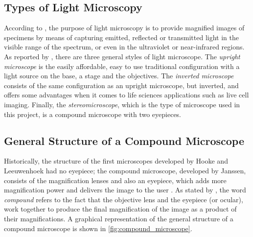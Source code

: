 \subsection{Types of Light Microscopy}

According to , the purpose of light microscopy is to provide magnified images of specimens by means of capturing emitted, reflected or transmitted light in the visible range of the spectrum, or even in the ultraviolet or near-infrared regions. As reported by , there are three general styles of light microscope. The \emph{upright microscope} is the easily affordable, easy to use traditional configuration with a light source on the base, a stage and the objectives. The \emph{inverted microscope} consists of the same configuration as an upright microscope, but inverted, and offers some advantages when it comes to life sciences applications such as live cell imaging. Finally, the \emph{stereomicroscope}, which is the type of microscope used in this project, is a compound microscope with two eyepieces.

\subsection{General Structure of a Compound Microscope}

Historically, the structure of the first microscopes developed by Hooke and Leeuwenhoek had no eyepiece; the compound microscope, developed by Janssen, consists of the magnification lenses and also an eyepiece, which adds more magnification power and delivers the image to the user \cite{lawlor2019introduction}. As stated by , the word \emph{compound} refers to the fact that the objective lens and the eyepiece (or ocular), work together to produce the final magnification of the image as a product of their magnifications. A graphical representation of the general structure of a compound microscope is shown in \autoref{fig:compound_microscope}.

